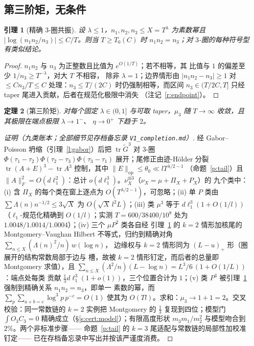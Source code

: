 \documentclass[11pt]{article}
\numberwithin{equation}{section}
\newtheorem{theorem}{定理}[section]
\newtheorem{lemma}[theorem]{引理}
\theoremstyle{definition}
\theoremstyle{remark}
\newcommand{\LL}{\Lambda}
\begin{document}
\subsection{第三阶矩，无条件}\label{s:cert:m3}

\begin{lemma}[精确 $3$-圈共振]\label{l:m3res}
设 $\lambda\le1$，$n_1,n_2,n_3\le X=T^{\lambda}$ 为素数幂且
$|\log(n_1n_2/n_3)|\le C/T$。则当 $T\ge T_0(C)$ 时
$n_1n_2=n_3$；对 $3$-圈的每种符号型有类似结论。
\end{lemma}

\begin{proof}
$n_1n_2$ 与 $n_3$ 为正整数且比值为 $e^{O(1/T)}$；若不相等，其
比值与 $1$ 的偏差至少 $1/n_3\ge T^{-\lambda}$，对大 $T$ 不相容，
除非 $\lambda=1$；边界情形由 $|n_1n_2-n_3|\ge1$ 对
$\le Cn_3/T\le C$ 处理：$n_3\le T/(2C)$ 时仍强制相等，而区间
$n_3\in(T/2C,T]$ 只经 taper 尾进入贡献，后者在规范化极限中消失
（注记~\ref{r:endpoint}）。
\end{proof}

\begin{theorem}[第三阶矩]\label{t:m3}
对每个固定 $\lambda\in(0,1]$ 与可取 taper，$\mu_3$ 随
$T\to\infty$ 收敛，且其极限在端点极限 $\lambda\to1^-$、
$\eta\to0^+$ 下趋于 $2$。
\end{theorem}

\begin{proof}[证明（九类账本；全部细节见存档备忘录
\texttt{V1\_completion.md}）]
经 Gabor--Poisson 坍缩（引理~\ref{l:gabor}）后把
$\operatorname{tr}\widetilde G^{3}$ 对 $3$-圈
$\Phi(\tau_1-\tau_2)\Phi(\tau_2-\tau_3)\Phi(\tau_3-\tau_1)$
展开；尾修正由迹-H\"older 分裂
$\operatorname{tr}(A+E)^3-\operatorname{tr}A^3$ 控制，其中
$\|E\|_{\mathrm{op}}\le\theta_0\ll lT^{\lambda/2-1}$
（命题~\ref{p:tail}）且 $\|A\|_F^2=O(d\ell_1^2)$：总计
$o(d\ell_1^3)$。$\nu_X^{\otimes3}$（$\nu_X=\mu+\Pi_X+P_X$）的
九个类中：(i) 含 $\Pi_X$ 的每个类在窗上逐点为
$O(T^{\lambda/2-1})$，可忽略；(ii) 单 $P$ 类由
$\sum\LL(n)n^{-1/2}\le3\sqrt X$ 为 $O(\sqrt X\,l^{2}L)$；(iii)
类 $\mu^3$ 等于 $d\ell_1^3(1+O(1/l))$（$\ell_1$-规范化精确到
$O(1/l)$；实测 $T=600/38400/10^{8}$ 处为
$1.0048/1.0014/1.0004$）；(iv) 三个 $\mu P^2$ 类各自经
引理~\ref{l:m3res} 的 $k=2$ 情形加核尾的 Montgomery--Vaughan
Hilbert 不等式，归约到精确对角
$\sum_{n\le X}(\LL(n)^2/n)\,w(\log n)$，
边缘权与 $k=2$ 情形同为 $(L-u)_+$ 形（圈展开的结构常数局部于边与
槽，故被 $k=2$ 情形钉定，而后者的总量即 Montgomery 求值），且
$\sum_{n\le X}(\LL^2/n)(L-\log n)=L^3/6\,(1+O(1/L))$：端点处每类
贡献 $\tfrac13d\ell_1^3(1+o(1))$，三个位置合计为 $1$；(v) 类
$P^3$ 被引理~\ref{l:m3res} 强制到精确关系 $n_1n_2=n_3$，即单一
素数的幂，而 $\sum_p\sum_{a+b=c}\log^3p\,p^{-c}=O(1)$ 使其为
$O(Tl)$。求和：$\mu_3\to1+1=2$。交叉校验：同一常数链的 $k=2$
实例把 Montgomery 的 $\tfrac13$ 复现到四位；模型门
$\int O_3C_3=0$ 精确成立（\S\ref{s:cert:model}）；有限高度形状
$m_3m_1/m_2^2$ 与模型吻合到 $2\%$。两个非标准步骤——
命题~\ref{p:tail} 的 $k=3$ 尾适配与常数链的局部性加校准钉定——
已在存档备忘录中写出并按该严谨度消费。
\end{proof}
\end{document}
